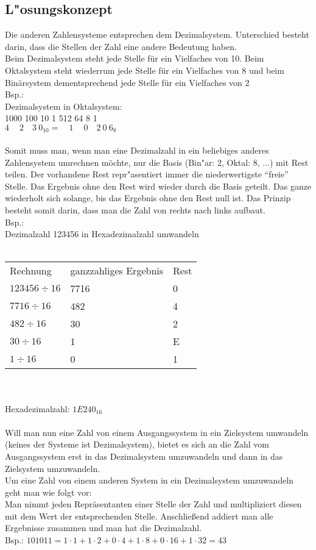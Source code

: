 \documentclass[a4paper,11pt,titlepage]{article}
\begin{document}
\subsection{L"osungskonzept}
Die anderen Zahlensysteme entsprechen dem Dezimalsystem. Unterschied besteht darin, dass die Stellen der Zahl eine andere Bedeutung haben.\\
Beim Dezimalsystem steht jede Stelle für ein Vielfaches von 10. Beim Oktalsystem steht wiederrum jede Stelle für ein Vielfaches von 8 und beim Binärsystem dementsprechend jede Stelle für ein Vielfaches von 2\\
Bsp.:\\
Dezimalsystem in Oktalsystem:\\
\scriptsize 1000 100 10 1\qquad{} 512 64 8 1 \\
\normalsize 
$4 \quad \ 2\quad3\ 0_{10} =\quad 1 \quad \ 0\quad2\ 0\ 6_8$\\
\\
Somit muss man, wenn man eine Dezimalzahl in ein beliebiges anderes Zahlensystem umrechnen möchte, nur die Basis (Bin"ar: 2, Oktal: 8, ...) mit Rest teilen. Der vorhandene Rest repr"asentiert immer die niederwertigste "`freie"' Stelle. Das Ergebnis ohne den Rest wird wieder durch die Basis geteilt. Das ganze wiederholt sich solange, bis das Ergebnis ohne den Rest null ist. Das Prinzip besteht somit darin, dass man die Zahl von rechts nach links aufbaut.\\
Bsp.:\\
Dezimalzahl 123456 in Hexadezimalzahl umwandeln\\
\\
\begin{tabular}{lll}
Rechnung&ganzzahliges Ergebnis&Rest\\
$123456 \div 16$ &7716&0\\
$7716 \div 16$ &482&4\\
$482 \div 16$ &30&2\\
$30 \div 16$ &1&E\\
$1 \div 16$ &0&1\\
\end{tabular}\\
\\
Hexadezimalzahl: $1E240_{16}$\\
\\
Will man nun eine Zahl von einem Ausgangssystem in ein Zielsystem umwandeln (keines der Systeme ist Dezimalsystem), bietet es sich an die Zahl vom Ausgangssystem erst in das Dezimalsystem umzuwandeln und dann in das Zielsystem umzuwandeln.\\
Um eine Zahl von einem anderen System in ein Dezimalsystem umzuwandeln geht man wie folgt vor:\\
Man nimmt jeden Repräsentanten einer Stelle der Zahl und multipliziert diesen mit dem Wert der entsprechenden Stelle. Anschließend addiert man alle Ergebnisse zusammen und man hat die Dezimalzahl.\\
Bsp.: $101011= 1\cdot 1 + 1\cdot 2 + 0\cdot 4 +1\cdot 8 +0\cdot 16 + 1\cdot 32 = 43$
\end{document}
